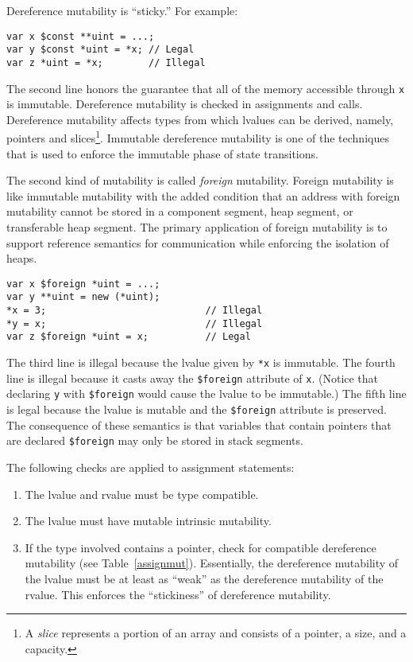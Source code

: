Dereference mutability is ``sticky.''
For example:
\begin{verbatim}
var x $const **uint = ...;
var y $const *uint = *x; // Legal
var z *uint = *x;        // Illegal
\end{verbatim}
The second line honors the guarantee that all of the memory accessible through \verb+x+ is immutable.
Dereference mutability is checked in assignments and calls.
Dereference mutability affects types from which lvalues can be derived, namely, pointers and slices\footnote{A \emph{slice} represents a portion of an array and consists of a pointer, a size, and a capacity.}.
Immutable dereference mutability is one of the techniques that is used to enforce the immutable phase of state transitions.

The second kind of mutability is called \emph{foreign} mutability.
Foreign mutability is like immutable mutability with the added condition that an address with foreign mutability cannot be stored in a component segment, heap segment, or transferable heap segment.
The primary application of foreign mutability is to support reference semantics for communication while enforcing the isolation of heaps.
\begin{verbatim}
var x $foreign *uint = ...;
var y **uint = new (*uint);
*x = 3;                            // Illegal
*y = x;                            // Illegal
var z $foreign *uint = x;          // Legal
\end{verbatim}
The third line is illegal because the lvalue given by \verb+*x+ is immutable.
The fourth line is illegal because it casts away the \verb|$foreign| attribute of \verb+x+.
(Notice that declaring \verb+y+ with \verb|$foreign| would cause the lvalue to be immutable.)
The fifth line is legal because the lvalue is mutable and the \verb|$foreign| attribute is preserved.
The consequence of these semantics is that variables that contain pointers that are declared \verb|$foreign| may only be stored in stack segments.


The following checks are applied to assignment statements:
\begin{enumerate}
\item The lvalue and rvalue must be type compatible.
\item The lvalue must have mutable intrinsic mutability.
\item If the type involved contains a pointer, check for compatible dereference mutability (see Table~\ref{assignmut}).
  Essentially, the dereference mutability of the lvalue must be at least as ``weak'' as the dereference mutability of the rvalue.
  This enforces the ``stickiness'' of dereference mutability.
\end{enumerate}

